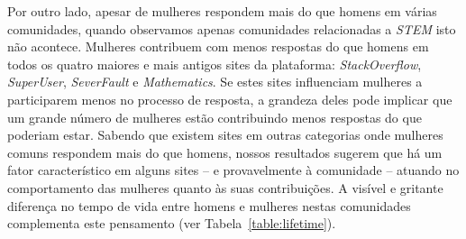 


Por outro lado, apesar de mulheres respondem mais do que homens em várias comunidades, quando observamos apenas comunidades relacionadas a \emph{STEM} isto não acontece. Mulheres contribuem com menos respostas do que homens em todos os quatro maiores e mais antigos sites da plataforma: \emph{StackOverflow}, \emph{SuperUser}, \emph{SeverFault} e \emph{Mathematics}. Se estes sites influenciam mulheres a participarem menos no processo de resposta, a grandeza deles pode implicar que um grande número de mulheres estão contribuindo menos respostas do que poderiam estar. Sabendo que existem sites em outras categorias onde mulheres comuns respondem mais do que homens, nossos resultados sugerem que há um fator característico em alguns sites -- e provavelmente à comunidade -- atuando no comportamento das mulheres quanto às suas contribuições. A visível e gritante diferença no tempo de vida entre homens e mulheres nestas comunidades complementa este pensamento (ver Tabela~\ref{table:lifetime}).


